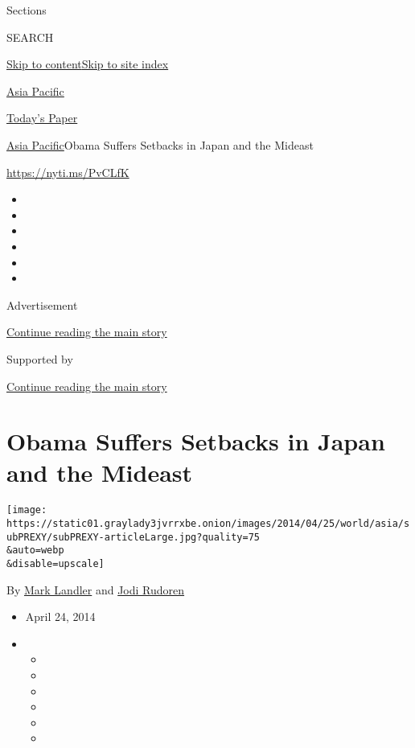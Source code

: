 Sections

SEARCH

\protect\hyperlink{site-content}{Skip to
content}\protect\hyperlink{site-index}{Skip to site index}

\href{https://www.nytimes3xbfgragh.onion/section/world/asia}{Asia
Pacific}

\href{https://myaccount.nytimes3xbfgragh.onion/auth/login?response_type=cookie\&client_id=vi}{}

\href{https://www.nytimes3xbfgragh.onion/section/todayspaper}{Today's
Paper}

\href{/section/world/asia}{Asia Pacific}\textbar{}Obama Suffers Setbacks
in Japan and the Mideast

\url{https://nyti.ms/PvCLfK}

\begin{itemize}
\item
\item
\item
\item
\item
\item
\end{itemize}

Advertisement

\protect\hyperlink{after-top}{Continue reading the main story}

Supported by

\protect\hyperlink{after-sponsor}{Continue reading the main story}

\hypertarget{obama-suffers-setbacks-in-japan-and-the-mideast}{%
\section{Obama Suffers Setbacks in Japan and the
Mideast}\label{obama-suffers-setbacks-in-japan-and-the-mideast}}

\texttt{[image: https://static01.graylady3jvrrxbe.onion/images/2014/04/25/world/asia/subPREXY/subPREXY-articleLarge.jpg?quality=75\\\&auto=webp\\\&disable=upscale]}

By \href{http://www.nytimes3xbfgragh.onion/by/mark-landler}{Mark
Landler} and
\href{http://www.nytimes3xbfgragh.onion/by/jodi-rudoren}{Jodi Rudoren}

\begin{itemize}
\item
  April 24, 2014
\item
  \begin{itemize}
  \item
  \item
  \item
  \item
  \item
  \item
  \end{itemize}
\end{itemize}

